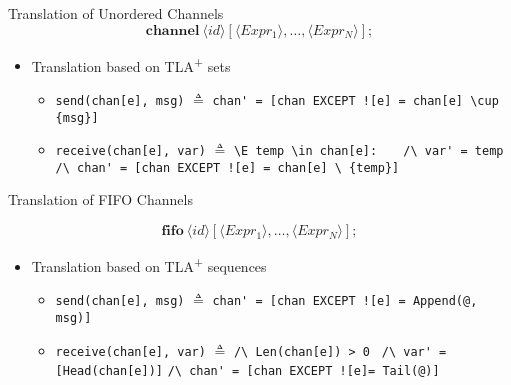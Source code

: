 \documentclass{beamer}
\newcommand{\tlaplus}{TLA\textsuperscript{+}\xspace}
\newcommand{\keyword}[1]{\textbf{#1}}
\newcommand{\entity}[1]{\ensuremath{\langle}#1\ensuremath{\rangle}}
\begin{document}
\begin{frame}[fragile]{Translation of Unordered Channels}
        \[
            \keyword{channel}\ \entity{id}[\entity{Expr_1},\dots,\entity{Expr_N}];
        \]
    \begin{itemize}

     \item Translation based on \tlaplus sets
     \newline
        \begin{itemize}
            \item \verb|send(chan[e], msg)| $\triangleq$
            \verb|chan' = [chan EXCEPT ![e] = chan[e] \cup {msg}]| 
            \newline
            \item \verb|receive(chan[e], var)| $\triangleq$\newline
                  \verb|\E temp \in chan[e]:| \newline 
                  \verb|   /\ var' = temp|\newline 
                  \verb|   /\ chan' = [chan EXCEPT ![e] = chan[e] \ {temp}]|
        \end{itemize}

    \end{itemize}
\end{frame}

\begin{frame}[fragile]{Translation of FIFO Channels}

        \[
            \keyword{fifo}\ \entity{id}[\entity{Expr_1},\dots,\entity{Expr_N}];
        \]
    \begin{itemize}    
     \item Translation based on \tlaplus sequences
     \newline
            \begin{itemize}
                \item \verb|send(chan[e], msg)| $\triangleq$
                \verb|chan' = [chan EXCEPT ![e] = Append(@, msg)]| 
                \newline
                \item \verb|receive(chan[e], var)| $\triangleq$\newline
                      \verb|/\ Len(chan[e]) > 0 | \newline
                      \verb|/\ var' = [Head(chan[e])]|\newline 
                      \verb|/\ chan' = [chan EXCEPT ![e]= Tail(@)]|
            \end{itemize}
    \end{itemize}
\end{frame}
\end{document}

